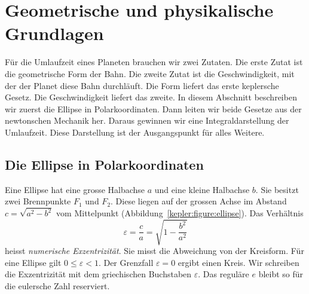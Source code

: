 %
%
%
\section{Geometrische und physikalische Grundlagen
\label{kepler:section:grundlagen}}
%

Für die Umlaufzeit eines Planeten brauchen wir zwei Zutaten.
Die erste Zutat ist die geometrische Form der Bahn.
Die zweite Zutat ist die Geschwindigkeit, mit der der Planet diese Bahn durchläuft.
Die Form liefert das erste keplersche Gesetz.
Die Geschwindigkeit liefert das zweite.
In diesem Abschnitt beschreiben wir zuerst die Ellipse in Polarkoordinaten.
Dann leiten wir beide Gesetze aus der newtonschen Mechanik her.
Daraus gewinnen wir eine Integraldarstellung der Umlaufzeit.
Diese Darstellung ist der Ausgangspunkt für alles Weitere.

\subsection{Die Ellipse in Polarkoordinaten
\label{kepler:subsection:ellipse}}



Eine Ellipse hat eine grosse Halbachse $a$ und eine kleine Halbachse $b$.
%
Sie besitzt zwei Brennpunkte $F_1$ und $F_2$.
%
Diese liegen auf der grossen Achse im Abstand $c=\!\sqrt{a^2-b^2}$ vom Mittelpunkt (Abbildung~\ref{kepler:figure:ellipse}).
Das Verhältnis
\begin{equation}
\varepsilon
=
\frac{c}{a}
=
\!\sqrt{1-\frac{b^2}{a^2}}
\label{kepler:eqn:exzentrizitaet}
\end{equation}
heisst \emph{numerische Exzentrizität}.
%
Sie misst die Abweichung von der Kreisform.
Für eine Ellipse gilt $0\le \varepsilon<1$.
Der Grenzfall $\varepsilon=0$ ergibt einen Kreis.
Wir schreiben die Exzentrizität mit dem griechischen Buchstaben $\varepsilon$.
%
Das reguläre $e$ bleibt so für die eulersche Zahl reserviert.
%
%

